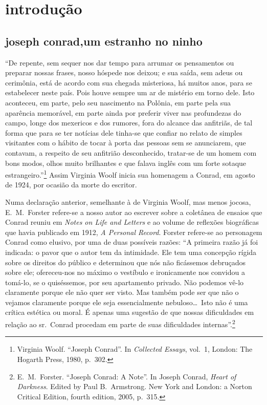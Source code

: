 

\section[Introdução, por Bernadete Limongi]{introdução}

\subsection{joseph conrad,\break um estranho no ninho}

``De repente, sem sequer nos dar tempo para arrumar os
pensamentos ou preparar nossas frases, nosso hóspede nos deixou; e sua
saída, sem adeus ou cerimônia, está de acordo com sua chegada
misteriosa, há muitos anos, para se estabelecer neste país. Pois houve
sempre um ar de mistério em torno dele. Isto aconteceu, em parte, pelo
seu nascimento na Polônia, em parte pela sua aparência memorável, em
parte ainda por preferir viver nas profundezas do campo, longe dos
mexericos e dos rumores, fora do alcance das anfitriãs, de tal forma
que para se ter notícias dele tinha{}-se que confiar no relato de
simples visitantes com o hábito de tocar à porta das pessoas sem se
anunciarem, que contavam, a respeito de seu anfitrião desconhecido,
tratar{}-se de um homem com bons modos, olhos muito brilhantes e que
falava inglês com um forte sotaque estrangeiro.''\footnote{ Virginia
Woolf. ``Joseph Conrad''. In \textit{Collected Essays}, vol.~1, London: The
Hogarth Press, 1980, p.~302.} Assim Virginia Woolf inicia sua homenagem a Conrad, em agosto
de 1924, por ocasião da  morte do escritor. 

Numa declaração anterior, semelhante à de Virginia Woolf, mas
menos jocosa, E.~M.~Forster refere{}-se a nosso autor ao escrever sobre
a coletânea de ensaios que Conrad reuniu em \textit{Notes on
Life and Letters} e ao volume de reflexões biográficas que
havia publicado em 1912, \textit{A Personal Record}. 
Forster refere{}-se ao personagem Conrad como elusivo, por uma de duas
possíveis razões: ``A primeira razão já foi indicada: o pavor que o
autor tem da intimidade. Ele tem uma concepção rígida sobre os direitos
do público e determinou que nós não ficássemos debruçados sobre ele;
ofereceu{}-nos  no máximo o vestíbulo e ironicamente nos convidou a
tomá{}-lo, se o quiséssemos, por seu apartamento privado. Não podemos
vê{}-lo claramente porque ele não quer ser visto. Mas também pode ser
que não o vejamos claramente porque ele seja essencialmente
nebuloso\ldots\ Isto não é uma crítica estética ou moral. É apenas uma
sugestão de que nossas dificuldades em relação ao sr.~Conrad procedam
em parte de suas dificuldades internas''.\footnote{ E.~M.~Forster. ``Joseph Conrad: 
A Note''. In Joseph Conrad, \textit{Heart of Darkness}. Edited by Paul B.~Armstrong. 
New York and London: a Norton Critical Edition, fourth edition, 2005, p.~315.}

